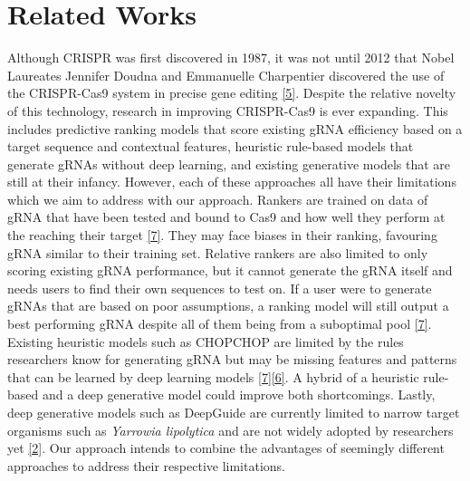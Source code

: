 \documentclass{article}
\begin{document}
\section{Related Works}
Although CRISPR was first discovered in 1987, it was not until 2012 that Nobel Laureates Jennifer Doudna and Emmanuelle Charpentier discovered the use of the CRISPR-Cas9 system in precise gene editing \hyperref[Reference 5]{[5]}. Despite the relative novelty of this technology, research in improving CRISPR-Cas9 is ever expanding. This includes predictive ranking models that score existing gRNA efficiency based on a target sequence and contextual features, heuristic rule-based models that generate gRNAs without deep learning, and existing generative models that are still at their infancy. However, each of these approaches all have their limitations which we aim to address with our approach. Rankers are trained on data of gRNA that have been tested and bound to Cas9 and how well they perform at the reaching their target \hyperref[Reference 7]{[7]}. They may face biases in their ranking, favouring gRNA similar to their training set. Relative rankers are also limited to only scoring existing gRNA performance, but it cannot generate the gRNA itself and needs users to find their own sequences to test on. If a user were to generate gRNAs that are based on poor assumptions, a ranking model will still output a best performing gRNA despite all of them being from a suboptimal pool \hyperref[Reference 7]{[7]}. Existing heuristic models such as CHOPCHOP are limited by the rules researchers know for generating gRNA but may be missing features and patterns that can be learned by deep learning models \hyperref[Reference 7]{[7]}\hyperref[Reference 6]{[6]}. A hybrid of a heuristic rule-based and a deep generative model could improve both shortcomings. Lastly, deep generative models such as DeepGuide are currently limited to narrow target organisms such as \textit{Yarrowia lipolytica} and are not widely adopted by researchers yet \hyperref[Reference 2]{[2]}. Our approach intends to combine the advantages of seemingly different approaches to address their respective limitations.
\end{document}
